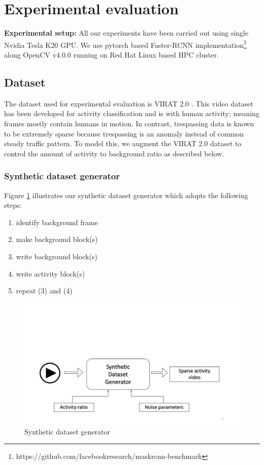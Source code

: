 \section{Experimental evaluation}
\label{sec:exp-eval}
\textbf{Experimental setup:}
All our experiments have been carried out using single Nvidia Tesla K20 GPU. We use pytorch based Faster-RCNN implementation\footnote{https://github.com/facebookresearch/maskrcnn-benchmark} along OpenCV v4.0.0 running on Red Hat Linux based HPC cluster. 

\subsection{Dataset}
The dataset used for experimental evaluation is VIRAT 2.0 \cite{virat20}. This video dataset has been developed for activity classification and is with human activity; meaning frames mostly contain humans in motion. In contrast, trespassing data is known to be extremely sparse because trespassing is an anomaly instead of common steady traffic pattern. To model this, we augment the VIRAT 2.0 dataset to control the amount of activity to background ratio as described below.

\vspace{5pt}
\subsubsection{Synthetic dataset generator}
\label{sec:synthetic-dataset-generator}
Figure \ref{fig:synthetic-dataset-generator} illustrates our synthetic dataset generator which adopts the following steps: 
\begin{enumerate} 
    \item identify background frame
    \item make background block(s)
    \item write background block(s)
    \item write activity block(s)
    \item repeat (3) and (4)
\end{enumerate}

\begin{figure}
    \centering
    \includegraphics[width=\linewidth,trim={0 50 0 200},clip]{images/synthetic-dataset-generator}
    \caption{Synthetic dataset generator}
    \label{fig:synthetic-dataset-generator}
\end{figure}

